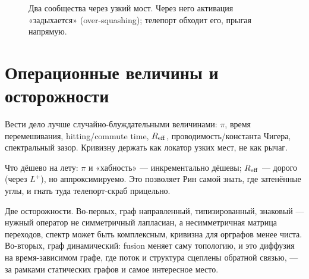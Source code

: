 \begin{figure}[h]
\centering
{}
\caption{Два сообщества через узкий мост. Через него активация «задыхается»
(over-squashing); телепорт обходит его, прыгая напрямую.}
\end{figure}

\section{Операционные величины и осторожности}

Вести дело лучше случайно-блуждательными величинами: $\pi$, время
перемешивания, hitting/commute time, $R_{\mathrm{eff}}$, проводимость/константа Чигера,
спектральный зазор. Кривизну держать как локатор узких мест, не как рычаг.

Что дёшево на лету: $\pi$ и «хабность» --- инкрементально дёшевы; $R_{\mathrm{eff}}$ ---
дорого (через $L^+$), но аппроксимируемо. Это позволяет Рин самой знать, где
затенённые углы, и гнать туда телепорт-скраб прицельно.

Две осторожности. Во-первых, граф направленный, типизированный, знаковый ---
нужный оператор не симметричный лапласиан, а несимметричная матрица переходов,
спектр может быть комплексным, кривизна для орграфов менее чиста. Во-вторых,
граф динамический: fusion меняет саму топологию, и это диффузия на
время-зависимом графе, где поток и структура сцеплены обратной связью, --- за
рамками статических графов и самое интересное место.
